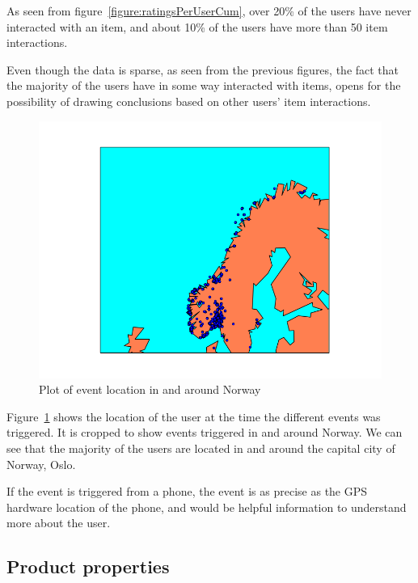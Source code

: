         As seen from figure~\ref{figure:ratingsPerUserCum}, over 20\% of the users have never interacted with an item, and about 10\% of the users have more than 50 item interactions.

        Even though the data is sparse, as seen from the previous figures, the fact that the majority of the users have in some way interacted with items, opens for the possibility of drawing conclusions based on other users' item interactions.

    \begin{figure}[H]
        \includegraphics[width=5in]{image/simpleGeoPlotNorway.png}
        \centering
        \caption{Plot of event location in and around Norway}
    \label{figure:croppedGeoplot}
    \end{figure}
        Figure~\ref{figure:croppedGeoplot} shows the location of the user at the time the different events was triggered.
        It is cropped to show events triggered in and around Norway.
        We can see that the majority of the users are located in and around the capital city of Norway, Oslo.

        If the event is triggered from a phone, the event is as precise as the GPS hardware location of the phone, and would be helpful information to understand more about the user.

\subsection{Product properties}

